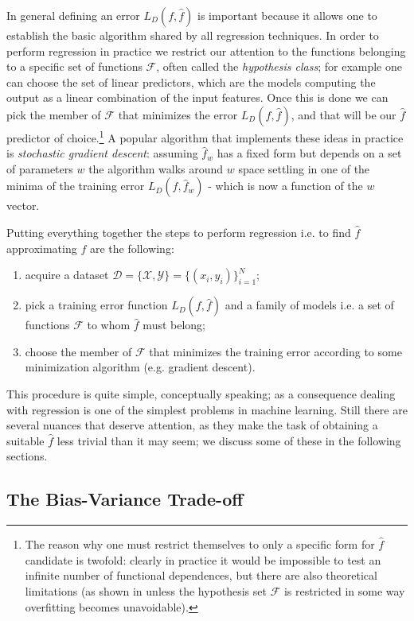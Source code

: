 In general defining an error $L_D(f, \hat{f})$ is important because it allows one to establish the basic algorithm shared by all regression techniques. In order to perform regression in practice we restrict our attention to the functions belonging to a specific set of functions $\mathcal{F}$, often called the \emph{hypothesis class}; for example one can choose the set of linear predictors, which are the models computing the output as a linear combination of the input features. Once this is done we can pick the member of $\mathcal{F}$ that minimizes the error $L_D(f, \hat{f})$, and that will be our $\hat{f}$ predictor of choice.\footnote{The reason why one must restrict themselves to only a specific form for $\hat{f}$ candidate is twofold: clearly in practice it would be impossible to test an infinite number of functional dependences, but there are also theoretical limitations (as shown in \cite{understanding_ml} unless the hypothesis set $\mathcal{F}$ is restricted in some way overfitting becomes unavoidable).} A popular algorithm that implements these ideas in practice is \emph{stochastic gradient descent}: assuming $\hat{f}_w$ has a fixed form but depends on a set of parameters $w$ the algorithm walks around $w$ space settling in one of the minima of the training error $L_D(f, \hat{f}_w)$ - which is now a function of the $w$ vector.

Putting everything together the steps to perform regression i.e. to find $\hat{f}$ approximating $f$ are the following:
\begin{enumerate}
    \item acquire a dataset $\mathcal{D} = \{\mathcal{X}, \mathcal{Y}\} = \{(x_i, y_i)\}_{i=1}^N$;
    \item pick a training error function $L_D(f, \hat{f})$ and a family of models i.e. a set of functions $\mathcal{F}$ to whom $\hat{f}$ must belong;
    \item choose the member of $\mathcal{F}$ that minimizes the training error according to some minimization algorithm (e.g. gradient descent).
\end{enumerate}
This procedure is quite simple, conceptually speaking; as a consequence dealing with regression is one of the simplest problems in machine learning. Still there are several nuances that deserve attention, as they make the task of obtaining a suitable $\hat{f}$ less trivial than it may seem; we discuss some of these in the following sections.

\subsection{The Bias-Variance Trade-off}

